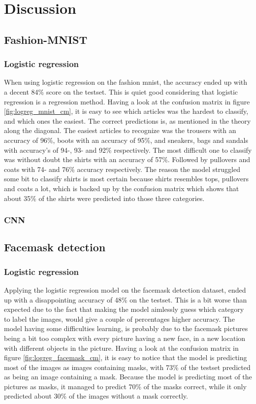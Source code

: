 \documentclass[../main.tex]{subfiles}
\begin{document}
\section{Discussion}

\subsection{Fashion-MNIST}
\subsubsection{Logistic regression}
When using logistic regression on the fashion mnist, the accuracy ended up with a decent 84\% score on the testset. This is quiet good considering that logistic regression is a regression method. Having a look at the confusion matrix in figure \ref{fig:logreg_mnist_cm}, it is easy to see which articles was the hardest to classify, and which ones the easiest. The correct predictions is, as mentioned in the theory along the diagonal. The easiest articles to recognize was the trousers with an accuracy of 96\%, boots with an accuracy of 95\%, and sneakers, bags and sandals with accuracy's of 94-, 93- and 92\% respectively. The most difficult one to classify was without doubt the shirts with an accuracy of 57\%. Followed by pullovers and coats with 74- and 76\% accuracy respectively. The reason the model struggled some bit to classify shirts is most certain because shirts resembles tops, pullovers and coats a lot, which is backed up by the confusion matrix which shows that about 35\% of the shirts were predicted into those three categories.

\subsubsection{CNN}

\subsection{Facemask detection}
\subsubsection{Logistic regression}
Applying the logistic regression model on the facemask detection dataset, ended up with a disappointing accuracy of 48\% on the testset. This is a bit worse than expected due to the fact that making the model aimlessly guess which category to label the images, would give a couple of percentages higher accuracy. The model having some difficulties learning, is probably due to the facemask pictures being a bit too complex with every picture having a new face, in a new location with different objects in the picture. Having a look at the confusion matrix in figure \ref{fig:logreg_facemask_cm}, it is easy to notice that the model is predicting most of the images as images containing masks, with 73\% of the testset predicted as being an image containing a mask. Because the model is predicting most of the pictures as masks, it managed to predict 70\% of the masks correct, while it only predicted about 30\% of the images without a mask correctly.
\end{document}

